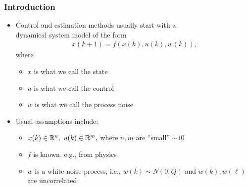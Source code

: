 \documentclass[aspectratio=169,handout]{beamer} 	%
\begin{document}




\begin{frame}
	\frametitle{Introduction}
	\begin{itemize}[<+->]
		\itemsep\baselineskip
		\item Control and estimation methods usually start with a \\ dynamical system 
		model of the form
		\begin{align*}
			x(k + 1) = f( x(k), u(k), w(k) ),
		\end{align*}
		where%
		\begin{itemize}
			\item $x$ is what we call the \alert{state}
			\item $u$ is what we call the \alert{control}
			\item $w$ is what we call the \alert{process noise}
		\end{itemize}
	
		\item Usual assumptions include:
		\begin{itemize}
			\item $x(k) \in \real[n], ~u(k) \in \real[m],$  where $n,m$ are ``small'' $\sim 10$
			\item $f$ is known, e.g., from physics
			\item $w$ is a white noise process, i.e., $w(k) \sim N(0, Q)$ and $w(k), w(\ell)$
			are uncorrelated
		\end{itemize}

	\end{itemize}
	
\end{frame}
\end{document}
